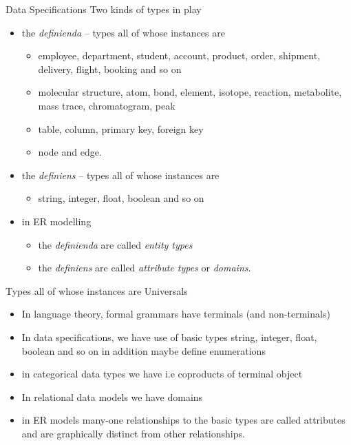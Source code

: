 \begin{frame}{Data Specifications}
Two kinds of types in play
\begin{itemize}
\item  the \textit{definienda} -- types all of whose instances are 
\begin{itemize}
\item employee, department, student, account, product, order, shipment, delivery, flight, booking and so on
\item molecular structure, atom, bond, element, isotope, reaction, metabolite, mass trace, chromatogram, peak
\item table, column, primary key, foreign key
\item node and edge. 
\end{itemize}
\pause 
\item  the \textit{definiens}  -- types all of whose instances are 
\begin{itemize}
       \item string, integer, float, boolean and so on
\end{itemize}
\end{itemize}
\pause
\begin{itemize}
\item in ER modelling 
\begin{itemize}
\item the \textit{definienda} are called \textit{entity types}
\item the \textit{definiens} are called \textit{attribute types} or \textit{domains}.
\end{itemize}
\end{itemize}
\end{frame}

\begin{frame}{Types all of whose instances are Universals}
\begin{itemize}
\item In language theory, formal grammars have terminals (and non-terminals)
\pause \item In data specifications, we have use of basic types string, integer, float, boolean and so on
              in addition maybe define enumerations 
\pause \item in categorical data types we have  i.e coproducts of terminal object
\pause \item In relational data models we have domains
\pause \item in ER models many-one relationships to the basic types are called attributes and are graphically distinct from other relationships.
\end{itemize}
\end{frame}



